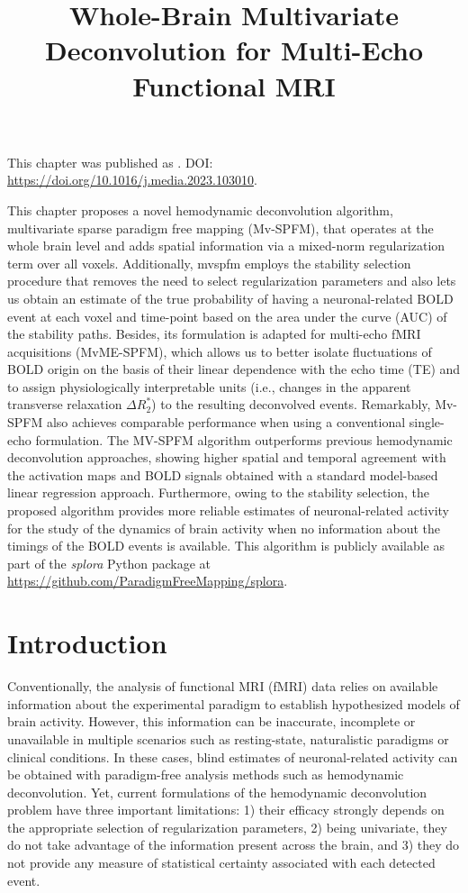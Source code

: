 \title{Whole-Brain Multivariate Deconvolution for Multi-Echo Functional MRI}
\label{cha:multivariate}

\begin{framed}\noindent This chapter was published as
    . DOI:
    \url{https://doi.org/10.1016/j.media.2023.103010}.
\end{framed}

This chapter proposes a novel hemodynamic deconvolution algorithm, multivariate
sparse paradigm free mapping (Mv-SPFM), that operates at the whole brain level
and adds spatial information via a mixed-norm regularization term over all
voxels. Additionally, \acrshort*{mvspfm} employs the stability selection
procedure that removes the need to select regularization parameters and also
lets us obtain an estimate of the true probability of having a neuronal-related
BOLD event at each voxel and time-point based on the area under the curve (AUC)
of the stability paths. Besides, its formulation is adapted for multi-echo fMRI
acquisitions (MvME-SPFM), which allows us to better isolate fluctuations of BOLD
origin on the basis of their linear dependence with the echo time (TE) and to
assign physiologically interpretable units (i.e., changes in the apparent
transverse relaxation $\Delta R_2^*$) to the resulting deconvolved events.
Remarkably, Mv-SPFM also achieves comparable performance when using a
conventional single-echo formulation. The MV-SPFM algorithm outperforms previous
hemodynamic deconvolution approaches, showing higher spatial and temporal
agreement with the activation maps and BOLD signals obtained with a standard
model-based linear regression approach. Furthermore, owing to the stability
selection, the proposed algorithm provides more reliable estimates of
neuronal-related activity for the study of the dynamics of brain activity when
no information about the timings of the BOLD events is available. This algorithm
is publicly available as part of the \textit{splora} Python package at
\url{https://github.com/ParadigmFreeMapping/splora}.

\section{Introduction}
\label{sec:multivariate_introduction}

Conventionally, the analysis of functional MRI (fMRI) data relies on available
information about the experimental paradigm to establish hypothesized models of
brain activity. However, this information can be inaccurate, incomplete or
unavailable in multiple scenarios such as resting-state, naturalistic paradigms
or clinical conditions. In these cases, blind estimates of neuronal-related
activity can be obtained with paradigm-free analysis methods such as hemodynamic
deconvolution. Yet, current formulations of the hemodynamic deconvolution
problem have three important limitations: 1) their efficacy strongly depends on
the appropriate selection of regularization parameters, 2) being univariate,
they do not take advantage of the information present across the brain, and 3)
they do not provide any measure of statistical certainty associated with each
detected event.

